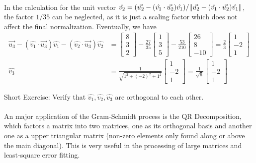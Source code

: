 \begin{exmp}
\begin{align*}
\end{align*}
In the calculation for the unit vector $\hat{v_2} = (\vec{u_2} - (\hat{v_1} \cdot \vec{u_2})\hat{v_1})/\norm{\vec{u_2} - (\hat{v_1} \cdot \vec{u_2})\hat{v_1}}$, the factor $1/35$ can be neglected, as it is just a scaling factor which does not affect the final normalization. Eventually, we have
\begin{align*}
\vec{u_3} - (\hat{v_1} \cdot \vec{u_3})\hat{v_1} - (\hat{v_2} \cdot \vec{u_3})\hat{v_2} &=
\begin{bmatrix}
8 \\
3 \\
2
\end{bmatrix}
-
\frac{27}{35}
\begin{bmatrix}
1 \\
3 \\
5
\end{bmatrix}
-
\frac{53}{210}
\begin{bmatrix}
26 \\
8 \\
-10
\end{bmatrix}
=
\frac{2}{3}
\begin{bmatrix}
1 \\
-2 \\
1
\end{bmatrix} \\
\hat{v_3} &= \frac{1}{\sqrt{1^2 + (-2)^2 + 1^2}}
\begin{bmatrix}
1 \\
-2 \\
1
\end{bmatrix}
= 
\frac{1}{\sqrt{6}}
\begin{bmatrix}
1 \\
-2 \\
1
\end{bmatrix}
\end{align*}
\end{exmp}
Short Exercise: Verify that $\hat{v_1}, \hat{v_2}, \hat{v_3}$ are orthogonal to each other.\\
\\
An major application of the Gram-Schmidt process is the QR Decomposition, which factors a matrix into two matrices, one as its orthogonal basis and another one as a upper triangular matrix (non-zero elements only found along or above the main diagonal). This is very useful in the processing of large matrices and least-square error fitting.
